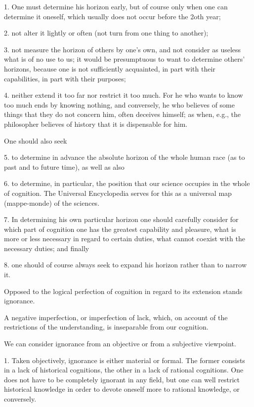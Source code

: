 1. One must determine his horizon early,
but of course only when one can determine it oneself,
which usually does not occur before the 2oth year;

2. not alter it lightly or often
(not turn from one thing to another);

3. not measure the horizon of others by one's own,
and not consider as useless what is of no use to us;
it would be presumptuous to want to determine others' horizons,
because one is not sufficiently acquainted,
in part with their capabilities,
in part with their purposes;

4. neither extend it too far nor restrict it too much.
For he who wants to know too much ends by knowing nothing,
and conversely, he who believes of some things
that they do not concern him, often deceives himself;
as when, e.g., the philosopher believes of history
that it is dispensable for him.

One should also seek

5. to determine in advance the absolute horizon of
the whole human race (as to past and to future time),
as well as also

6. to determine, in particular, the position that
our science occupies in the whole of cognition.
The Universal Encyclopedia serves for this as
a universal map (mappe-monde) of the sciences.

7. In determining his own particular horizon one should carefully consider for
which part of cognition one has the greatest capability and pleasure, what is
more or less necessary in regard to certain duties, what cannot coexist with
the necessary duties; and finally

8. one should of course always seek
to expand his horizon rather than to narrow it.

Opposed to the logical perfection of cognition
in regard to its extension stands ignorance.

A negative imperfection, or imperfection of lack, which,
on account of the restrictions of the understanding,
is inseparable from our cognition.

We can consider ignorance from an objective or from a subjective viewpoint.

1. Taken objectively, ignorance is either material or formal.
The former consists in a lack of historical cognitions,
the other in a lack of rational cognitions.
One does not have to be completely ignorant in any field,
but one can well restrict historical knowledge in order to
devote oneself more to rational knowledge, or conversely.

